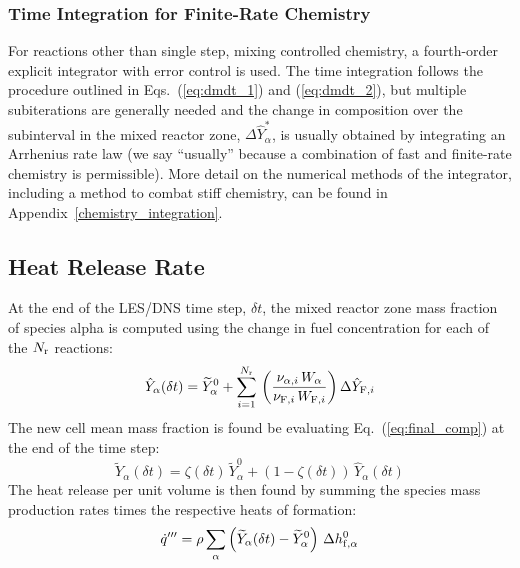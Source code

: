 \subsubsection{Time Integration for Finite-Rate Chemistry}

For reactions other than single step, mixing controlled chemistry, a fourth-order explicit integrator with error control is used. The time integration follows the procedure outlined in Eqs.~(\ref{eq:dmdt_1}) and (\ref{eq:dmdt_2}), but multiple subiterations are generally needed and the change in composition over the subinterval in the mixed reactor zone, $\Delta \hat{Y}_\alpha^*$, is usually obtained by integrating an Arrhenius rate law (we say ``usually'' because a combination of fast and finite-rate chemistry is permissible). More detail on the numerical methods of the integrator, including a method to combat stiff chemistry, can be found in Appendix~\ref{chemistry_integration}.


\subsection{Heat Release Rate}
\label{sec:hrr}

At the end of the LES/DNS time step, $\delta t$, the mixed reactor zone mass fraction of species alpha is computed using the change in fuel concentration for each of the $N_{\rm r}$ reactions:
\begin{equation}\label{eq:change_alpha}
\hat{Y}_\alpha(\delta t) = \widetilde{Y}_\alpha^0 + \sum_{i=1}^{N_{\rm r}} \,\left(\frac{\nu_{\alpha,i} \,W_{\alpha}}{\nu_{{\rm F},i} \,W_{{\rm F},i}}\right)\Delta \hat{Y}_{{\rm F},i}
\end{equation}
The new cell mean mass fraction is found be evaluating Eq.~(\ref{eq:final_comp}) at the end of the time step:
\begin{equation}
\label{eq:final_comp2}
\widetilde{Y}_{\alpha}(\delta t)= \zeta(\delta t) \, \widetilde{Y}_{\alpha}^0 + (1-\zeta(\delta t)) \, \hat{Y}_{\alpha}(\delta t)
\end{equation}
The heat release per unit volume is then found by summing the species mass production rates times the respective heats of formation:
\begin{equation}\label{eq:vol_heat_gen}
\dot{q}''' = \rho  \sum_{\alpha} \left( \widetilde{Y}_{\alpha}(\delta t)-\widetilde{Y}_{\alpha}^0 \right) \, \Delta h_{{\rm f},\alpha}^0
\end{equation}




